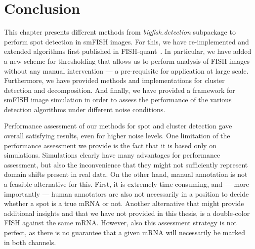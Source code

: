 
\section{Conclusion}
\label{sec:detection_conclusion}

This chapter presents different methods from \emph{bigfish.detection} subpackage to perform spot detection in \ac{smFISH} images.
For this, we have re-implemented and extended algorithms first published in FISH-quant~\cite{mueller_fish-quant_2013}. In particular, we have added a new scheme for thresholding that allows us to perform analysis of FISH images without any manual intervention --- a pre-requisite for application at large scale. Furthermore, we have provided methods and implementations for cluster detection and decomposition. And finally, we have provided a framework for \ac{smFISH} image simulation in order to assess the performance of the various detection algorithms under different noise conditions. 

Performance assessment of our methods for spot and cluster detection gave overall satisfying results, even for higher noise levels. One limitation of the performance assessment we provide is the fact that it is based only on simulations. Simulations clearly have many advantages for performance assessment, but also the inconvenience that they might not sufficiently represent domain shifts present in real data. On the other hand, manual annotation is not a feasible alternative for this. First, it is extremely time-consuming, and --- more importantly --- human annotators are also not necessarily in a position to decide whether a spot is a true \ac{mRNA} or not. Another alternative that might provide additional insights and that we have not provided in this thesis, is a double-color FISH against the same mRNA. However, also this assessment strategy is not perfect, as there is no guarantee that a given \ac{mRNA} will necessarily be marked in both channels.  


